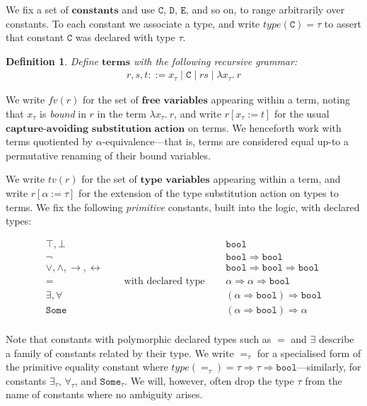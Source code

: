 \documentclass[a4paper, 10pt]{article}
\newtheorem{definition}{Definition}[section]
\newcommand{\deffont}[1]{\ensuremath{\textbf{#1}}}
\newcommand{\lam}[1]{\lambda{#1}.\ }
\begin{document}
We fix a set of \deffont{constants} and use $\mathtt{C}$, $\mathtt{D}$, $\mathtt{E}$, and so on, to range arbitrarily over constants.
To each constant we associate a type, and write $type(\mathtt{C}) = \tau$ to assert that constant $\mathtt{C}$ was declared with type $\tau$.

\begin{definition}
\label{defn.terms}
Define \deffont{terms} with the following recursive grammar:
\begin{gather*}
r,s,t ::= x_\tau \mid \mathtt{C} \mid rs \mid \lam{x_\tau}r
\end{gather*}
\end{definition}

We write $fv(r)$ for the set of \deffont{free variables} appearing within a term, noting that $x_\tau$ is \emph{bound} in $r$ in the term $\lam{x_\tau}r$, and write $r[x_\tau := t]$ for the usual \deffont{capture-avoiding substitution action} on terms.
We henceforth work with terms quotiented by $\alpha$-equivalence---that is, terms are considered equal up-to a permutative renaming of their bound variables.

We write $tv(r)$ for the set of \deffont{type variables} appearing within a term, and write $r[\alpha := \tau]$ for the extension of the type substitution action on types to terms.
We fix the following \emph{primitive} constants, built into the logic, with declared types:

\begin{displaymath}
\begin{array}{ccc}
\top, \bot & & \mathtt{bool} \\
\neg & & \mathtt{bool} \Rightarrow \mathtt{bool} \\
\vee, \wedge, \longrightarrow, \longleftrightarrow &  & \mathtt{bool} \Rightarrow \mathtt{bool} \Rightarrow \mathtt{bool} \\
= & \quad\text{ with declared type }\quad & \alpha \Rightarrow \alpha \Rightarrow \mathtt{bool} \\
\exists, \forall & & (\alpha \Rightarrow \mathtt{bool}) \Rightarrow \mathtt{bool} \\
\mathtt{Some} & & (\alpha \Rightarrow \mathtt{bool}) \Rightarrow \alpha \\
\end{array}
\end{displaymath}

Note that constants with polymorphic declared types such as $=$ and $\exists$ describe a family of constants related by their type.
We write $=_\tau$ for a specialised form of the primitive equality constant where $type(=_\tau) = \tau \Rightarrow \tau \Rightarrow \mathtt{bool}$---similarly, for constants $\exists_\tau$, $\forall_\tau$, and $\mathtt{Some}_\tau$.
We will, however, often drop the type $\tau$ from the name of constants where no ambiguity arises.
\end{document}
